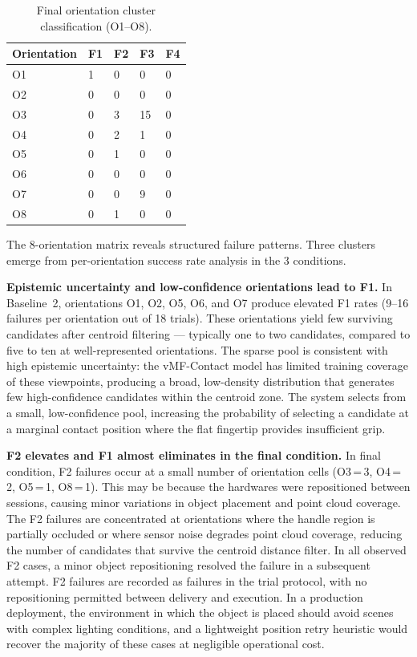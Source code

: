 \documentclass[12pt, a4paper]{report}
\begin{document}
\begin{table}[htbp]
  \centering
  \caption{Final orientation cluster classification (O1--O8).}
  \label{tab:final_orientation_clusters}
  \begin{tabular}{lllll}
    \toprule
    Orientation & F1 & F2 & F3 & F4 \\
    \midrule
    O1 & 1 & 0 & 0 & 0 \\
    O2 & 0 & 0 & 0 & 0 \\
    O3 & 0 & 3 & 15 & 0 \\
    O4 & 0 & 2 & 1 & 0 \\
    O5 & 0 & 1 & 0 & 0 \\
    O6 & 0 & 0 & 0 & 0 \\
    O7 & 0 & 0 & 9 & 0\\
    O8 & 0 & 1 & 0 & 0 \\
    \bottomrule
  \end{tabular}
\end{table}

The 8-orientation matrix reveals structured failure patterns. Three clusters emerge from per-orientation success rate analysis in the 3 conditions.

\textbf{Epistemic uncertainty and low-confidence orientations lead to F1.}
In Baseline~2, orientations O1, O2, O5, O6, and O7 produce elevated F1 rates (9--16 failures per orientation out of 18 trials). These orientations yield few surviving candidates after centroid filtering --- typically one to two candidates, compared to five to ten at well-represented orientations. The sparse pool is consistent with high epistemic uncertainty: the vMF-Contact model has limited training coverage of these viewpoints, producing a broad, low-density distribution that generates few high-confidence candidates within the centroid zone. The system selects from a small, low-confidence pool, increasing the probability of selecting a candidate at a marginal contact position where the flat fingertip provides insufficient grip.

\textbf{F2 elevates and F1 almost eliminates in the final condition.}
In final condition, F2 failures occur at a small number of orientation cells (O3\,=\,3, O4\,=\,2, O5\,=\,1, O8\,=\,1). This may be because the hardwares were repositioned between sessions, causing minor variations in object placement and point cloud coverage. The F2 failures are concentrated at orientations where the handle region is partially occluded or where sensor noise degrades point cloud coverage, reducing the number of candidates that survive the centroid distance filter.
In all observed F2 cases, a minor object repositioning resolved the failure in a subsequent attempt. 
F2 failures are recorded as failures in the trial protocol, with no repositioning permitted between delivery and execution. In a production deployment, the environment in which the object is placed should avoid scenes with complex lighting conditions, and a lightweight position retry heuristic would recover the majority of these cases at negligible operational cost.
\end{document}
